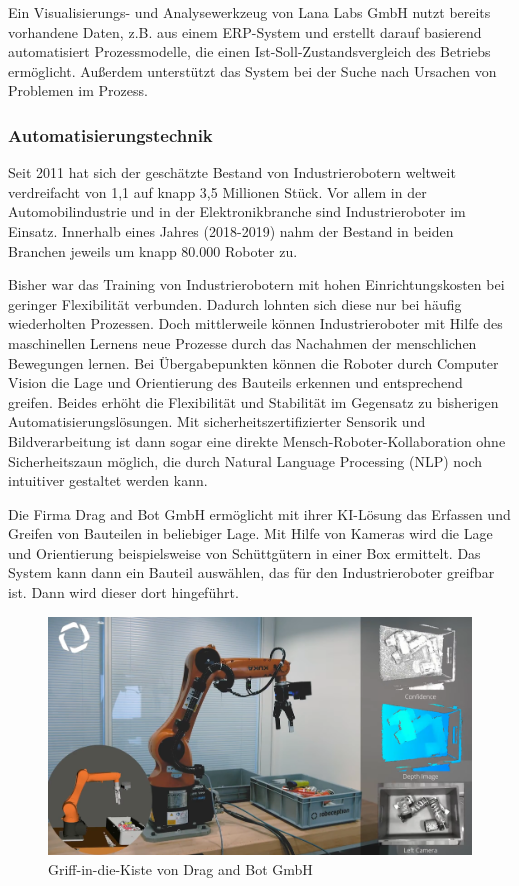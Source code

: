 \documentclass[a4paper,12pt, german]{report}
\begin{document}
Ein Visualisierungs- und Analysewerkzeug von Lana Labs GmbH nutzt bereits vorhandene Daten, z.B. aus einem ERP-System und erstellt darauf basierend automatisiert Prozessmodelle, die einen Ist-Soll-Zustandsvergleich des Betriebs ermöglicht. Außerdem unterstützt das System bei der Suche nach Ursachen von Problemen im Prozess.\cite{24}

\subsubsection{Automatisierungstechnik}
Seit 2011 hat sich der geschätzte Bestand von Industrierobotern weltweit verdreifacht von 1,1 auf knapp 3,5 Millionen Stück.\cite{21} Vor allem in der Automobilindustrie und in der Elektronikbranche sind Industrieroboter im Einsatz. Innerhalb eines Jahres (2018-2019) nahm der Bestand in beiden Branchen jeweils um knapp 80.000 Roboter zu.\cite{26}

Bisher war das Training von Industrierobotern mit hohen Einrichtungskosten bei geringer Flexibilität verbunden. Dadurch lohnten sich diese nur bei häufig wiederholten Prozessen. Doch mittlerweile können Industrieroboter mit Hilfe des maschinellen Lernens neue Prozesse durch das Nachahmen der menschlichen Bewegungen lernen. Bei Übergabepunkten können die Roboter durch Computer Vision die Lage und Orientierung des Bauteils erkennen und entsprechend greifen. Beides erhöht die Flexibilität und Stabilität im Gegensatz zu bisherigen Automatisierungslösungen.
Mit sicherheitszertifizierter Sensorik und Bildverarbeitung ist dann sogar eine direkte Mensch-Roboter-Kollaboration ohne Sicherheitszaun möglich, die durch Natural Language Processing (NLP) noch intuitiver gestaltet werden kann.\cite{24}

Die Firma Drag and Bot GmbH ermöglicht mit ihrer KI-Lösung das Erfassen und Greifen von Bauteilen in beliebiger Lage. Mit Hilfe von Kameras wird die Lage und Orientierung beispielsweise von Schüttgütern in einer Box ermittelt. Das System kann dann ein Bauteil auswählen, das für den Industrieroboter greifbar ist. Dann wird dieser dort hingeführt.\cite{40}

\begin{figure}[H]
  \center
 \includegraphics[width=12cm]{images/dragbot.png}
  \caption[Griff-in-die-Kiste von Drag and Bot GmbH]{Griff-in-die-Kiste von Drag and Bot GmbH \cite{40}}
\end{figure}
\end{document}
